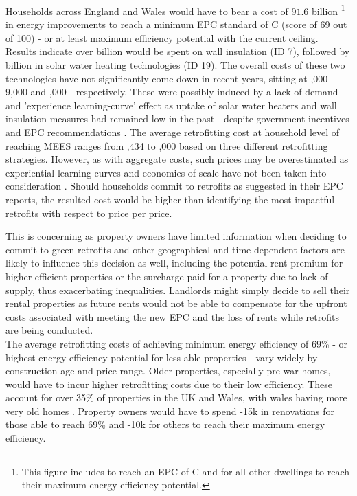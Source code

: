Households across England and Wales would have to bear a cost of \textsterling $91.6$ billion \footnote{This figure includes  to reach an EPC of C and  for all other dwellings to reach their maximum energy efficiency potential.} in energy improvements  to reach a minimum EPC standard of C (score of 69 out of 100) - or at least maximum efficiency potential with the current ceiling. Results indicate over  billion would be spent on wall insulation (ID 7), followed by  billion in solar water heating technologies (ID 19). The overall costs of these two technologies have not significantly come down in recent years, sitting at ,000-9,000 and ,000 - respectively. These were possibly induced by a lack of demand and 'experience learning-curve' effect \cite{lafond_how_2018, zhou_learning_2019, bosetti_witch_2006} as uptake of solar water heaters and wall insulation measures had remained low in the past - despite government incentives and EPC recommendations \cite{hamilton_uptake_2014}. The average retrofitting cost at household level of 
reaching MEES ranges from ,434 to ,000 based on three different retrofitting strategies. However, as with aggregate costs, such prices may be overestimated as experiential learning curves and economies of scale have not been taken into consideration \cite{lafond_how_2018}. Should households commit to retrofits as suggested in their EPC reports, the resulted cost would be higher than identifying the most impactful retrofits with respect to price per price. 

This is concerning as property owners have limited information when deciding to commit to green retrofits and other geographical and time dependent factors are likely to influence this decision as well, including the potential rent premium for higher efficient properties or the surcharge paid for a property due to lack of supply, thus exacerbating inequalities. Landlords might simply decide to sell their rental properties as future rents would not be able to compensate for the upfront costs associated with meeting the new EPC and the loss of rents while retrofits are being conducted. \\


The average retrofitting costs of achieving minimum energy efficiency of 69\% - or highest energy efficiency potential for less-able properties -  vary widely by construction age and price range. Older properties, especially pre-war homes, would have to incur higher retrofitting costs due to their low efficiency. These account for over 35\% of properties in the UK and Wales, with wales having more very old homes \cite{building_research_establishment_housing_2018}. Property owners would have to spend  -15k in renovations for those able to reach 69\% and -10k for others to reach their maximum energy efficiency. \\

